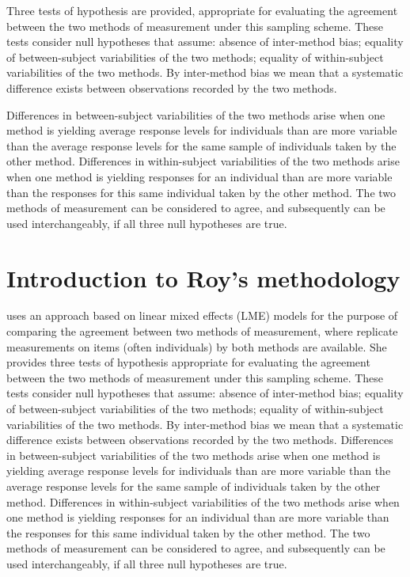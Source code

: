 \documentclass[12pt, a4paper]{report}
\theoremstyle{plain}
\theoremstyle{definition}
\theoremstyle{remark}
\begin{document}
Three tests of hypothesis are provided, appropriate for evaluating the agreement between the two methods of measurement under this sampling scheme. These tests consider null hypotheses that assume: absence of inter-method bias; equality of between-subject variabilities of the two methods; equality of within-subject variabilities of the two methods. By inter-method bias we mean that a systematic difference exists between observations recorded by the two methods. 

Differences in between-subject variabilities of the two methods arise when one method is yielding average response levels for individuals than are more variable than the average response levels for the same sample of individuals taken by the other method.  Differences in within-subject variabilities of the two methods arise when one method is yielding responses for an individual than are more variable than the responses for this same individual taken by the other method. The two methods of measurement can be considered to agree, and subsequently can be used interchangeably, if all three null hypotheses are true.	




\section{Introduction to Roy's methodology}

\citet{ARoy2009} uses an approach based on linear mixed effects (LME) models for the purpose of comparing the agreement between two methods of measurement, where replicate measurements on items (often individuals) by both methods are available. She provides three tests of hypothesis appropriate for evaluating the agreement between the two methods of measurement under this sampling scheme. These tests consider null hypotheses that assume: absence of inter-method bias; equality of between-subject variabilities of the two methods; equality of within-subject variabilities of the two methods. By inter-method bias we mean that a systematic difference exists between observations recorded by the two methods. Differences in between-subject variabilities of the two methods arise when one method is yielding average response levels for individuals than are more variable than the average response levels for the same sample of individuals taken by the other method.  Differences in within-subject variabilities of the two methods arise when one method is yielding responses for an individual than are more variable than the responses for this same individual taken by the other method. The two methods of measurement can be considered to agree, and subsequently can be used interchangeably, if all three null hypotheses are true.
		
\end{document}

